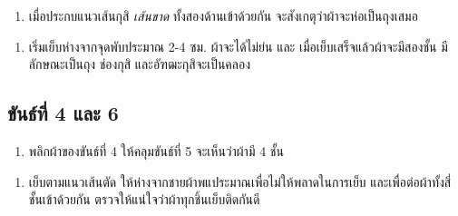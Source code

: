 

\begin{enumerate}
\def\labelenumi{(\arabic{enumi})}
\setcounter{enumi}{4}
\tightlist
\item
  เมื่อประกบแนวเส้นกุสิ \emph{เส้นขาด} ทั้งสองด้านเข้าด้วยกัน
  จะสังเกตุว่าผ้าจะห่อเป็นถุงเสมอ
\end{enumerate}



\begin{enumerate}
\def\labelenumi{(\arabic{enumi})}
\setcounter{enumi}{5}
\tightlist
\item
  เริ่มเย็บห่างจากจุดพับประมาณ 2-4 ซม. ผ้าจะได้ไม่ย่น และ
  เมื่อเย็บเสร็จแล้วผ้าจะมีสองชั้น มีลักษณะเป็นถุง ช่องกุสิ
  และอัฑฒะกุสิจะเป็นคลอง
\end{enumerate}



\clearpage

\subsection{ขันธ์ที่ 4 และ 6}

\begin{enumerate}
\def\labelenumi{(\arabic{enumi})}
\tightlist
\item
  พลิกผ้าของขันธ์ที่ 4 ให้คลุมขันธ์ที่ 5 จะเห็นว่าผ้ามี 4 ชั้น
\end{enumerate}

\setlength{\nextPhotoWidth}{0.6\textwidth}



\begin{enumerate}
\def\labelenumi{(\arabic{enumi})}
\setcounter{enumi}{1}
\tightlist
\item
  เย็บตามแนวเส้นตัด ให้ห่างจากชายผ้าพแประมาณเพื่อไม่ให้พลาดในการเย็บ
  และเพื่อต่อผ้าทั้งสี่ชั้นเข้าด้วยกัน
  ตรวจให้แน่ใจว่าผ้าทุกชิ้นเย็บติดกันดี
\end{enumerate}

